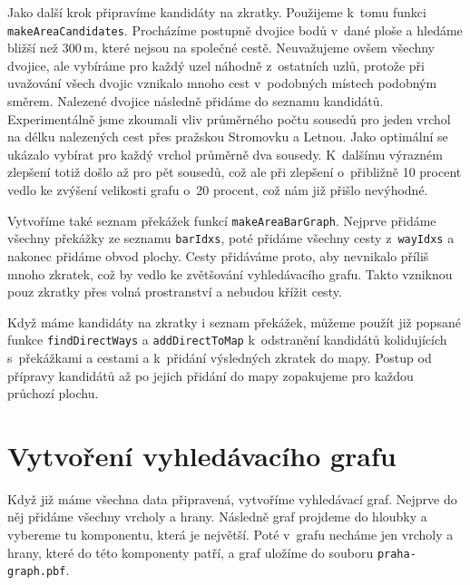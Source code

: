 Jako další krok připravíme kandidáty na zkratky. Použijeme k~tomu funkci
\verb|makeAreaCandidates|. Procházíme postupně dvojice bodů v~dané ploše a
hledáme bližší než 300\,m, které nejsou na společné cestě. Neuvažujeme ovšem
všechny dvojice, ale vybíráme pro každý uzel náhodně z~ostatních uzlů, protože
při uvažování všech dvojic vznikalo mnoho cest v~podobných místech podobným
směrem. Nalezené dvojice následně přidáme do seznamu kandidátů. Experimentálně
jsme zkoumali vliv průměrného počtu sousedů pro jeden vrchol na délku nalezených
cest přes pražskou Stromovku a Letnou. Jako optimální se ukázalo vybírat pro
každý vrchol průměrně dva sousedy. K~dalšímu výrazném zlepšení totiž došlo až
pro pět sousedů, což ale při zlepšení o~přibližně 10 procent vedlo ke zvýšení
velikosti grafu o~20 procent, což nám již  přišlo nevýhodné.

Vytvoříme také seznam překážek funkcí \verb|makeAreaBarGraph|. Nejprve přidáme
všechny překážky ze seznamu \verb|barIdxs|, poté přidáme všechny cesty
z~\verb|wayIdxs| a nakonec přidáme obvod plochy. Cesty přidáváme proto, aby
nevnikalo příliš mnoho zkratek, což by vedlo ke zvětšování vyhledávacího grafu.
Takto vzniknou pouz zkratky přes volná prostranství a nebudou křížit cesty.

Když máme kandidáty na zkratky i seznam překážek, můžeme použít již popsané funkce
\verb|findDirectWays| a \verb|addDirectToMap| k~odstranění kandidátů
kolidujících
s~překážkami a cestami a k~přidání výsledných zkratek do mapy. Postup od přípravy
kandidátů až po jejich přidání do mapy zopakujeme pro každou průchozí plochu.

\section{Vytvoření vyhledávacího grafu}
Když již máme všechna data připravená, vytvoříme vyhledávací graf. Nejprve do
něj přidáme všechny vrcholy a hrany. Následně graf projdeme do hloubky a
vybereme tu komponentu, která je největší. Poté v~grafu necháme jen vrcholy a
hrany, které do této komponenty patří, a graf uložíme do souboru
\verb|praha-graph.pbf|. 
